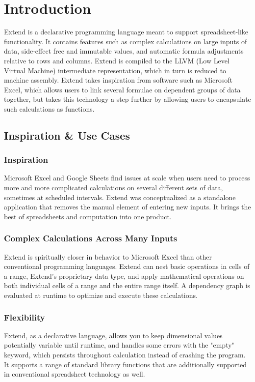 \chapter{Introduction}
Extend is a declarative programming language meant to support spreadsheet-like functionality. It contains features such as complex calculations on large inputs of data, side-effect free and immutable values, and automatic formula adjustments relative to rows and columns. Extend is compiled to the LLVM (Low Level Virtual Machine) intermediate representation, which in turn is reduced to machine assembly. Extend takes inspiration from software such as Microsoft Excel, which allows users to link several formulae on dependent groups of data together, but takes this technology a step further by allowing users to encapsulate such calculations as functions.

\section{Inspiration \& Use Cases}
	
	\subsection{Inspiration}
	Microsoft Excel and Google Sheets find issues at scale when users need to process more and more complicated calculations on several different sets of data, sometimes at scheduled intervals. Extend was conceptualized as a standalone application that removes the manual element of entering new inputs. It brings the best of spreadsheets and computation into one product.

	\subsection{Complex Calculations Across Many Inputs}
	Extend is spiritually closer in behavior to Microsoft Excel than other conventional programming languages. Extend can nest basic operations in cells of a range, Extend's proprietary data type, and apply mathematical operations on both individual cells of a range and the entire range itself. A dependency graph is evaluated at runtime to optimize and execute these calculations.
	
	\subsection{Flexibility}
	Extend, as a declarative language, allows you to keep dimensional values potentially variable until runtime, and handles some errors with the "empty" keyword, which persists throughout calculation instead of crashing the program. It supports a range of standard library functions that are additionally supported in conventional spreadsheet technology as well.